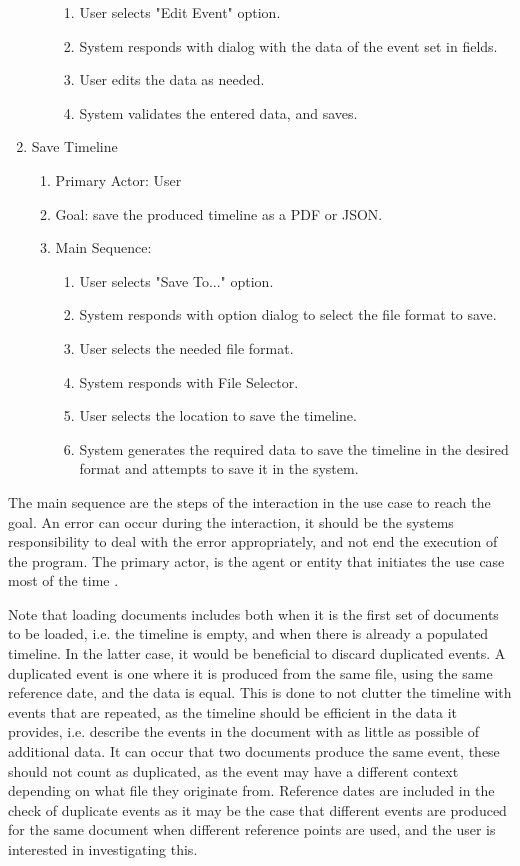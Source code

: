 \begin{enumerate}
\begin{enumerate}
\begin{enumerate}
		\item User selects "Edit Event" option.
		\item System responds with dialog with the data of the event set in fields.
		\item User edits the data as needed.
		\item System validates the entered data, and saves.
	\end{enumerate}
     \end{enumerate}
   \item Save Timeline
    \begin{enumerate}
	\item Primary Actor: User
	\item Goal: save the produced timeline as a PDF or JSON.
	\item Main Sequence:
	\begin{enumerate}
		\item User selects "Save To..." option.
		\item System responds with option dialog to select the file format to save.
		\item User selects the needed file format.
		\item System responds with File Selector.
		\item User selects the location to save the timeline.
		\item System generates the required data to save the timeline in the desired format and attempts to save it in the system.
	\end{enumerate}
    \end{enumerate}
\end{enumerate}

\par The main sequence are the steps of the interaction in the use case to reach the goal. An error can occur during the interaction, it should be the systems responsibility to deal with the error appropriately, and not end the execution of the program. The primary actor, is the agent or entity that initiates the use case most of the time \cite{oracleagent}.
\par Note that loading documents includes both when it is the first set of documents to be loaded, i.e. the timeline is empty, and when there is already a populated timeline. In the latter case, it would be beneficial to discard duplicated events. A duplicated event is one where it is produced from the same file, using the same reference date, and the data is equal. This is done to not clutter the timeline with events that are repeated, as the timeline should be efficient in the data it provides, i.e. describe the events in the document with as little as possible of additional data. It can occur that two documents produce the same event, these should not count as duplicated, as the event may have a different context depending on what file they originate from. Reference dates are included in the check of duplicate events as it may be the case that different events are produced for the same document when different reference points are used, and the user is interested in investigating this. 

